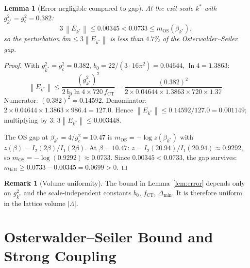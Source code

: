 \documentclass[11pt,a4paper]{amsart}
\newtheorem{lemma}[theorem]{Lemma}
\theoremstyle{definition}
\newtheorem{remark}[theorem]{Remark}
\newcommand{\norm}[1]{\left\|#1\right\|}
\newcommand{\Del}{\Delta_{\min}}
\newcommand{\gB}{g^2_c}
\begin{document}
\begin{lemma}[Error negligible compared to gap]
\label{lem:perturb}
At the exit scale $k^*$ with $g^2_{k^*} = \gB = 0.382$:
\[
  3\,\norm{E_{k^*}} \le 0.00345
  < 0.0733 \le m_{\mathrm{OS}}(\beta_{k^*}),
\]
so the perturbation $\delta m \le 3\norm{E_{k^*}}$ is less than
$4.7\%$ of the Osterwalder--Seiler gap.
\end{lemma}
\begin{proof}
With $g^2_{k^*} = \gB = 0.382$, $b_0 = 22/(3\cdot 16\pi^2) = 0.04644$, $\ln 4 = 1.3863$:
\[
  \norm{E_{k^*}}
  \le \frac{(g^2_{k^*})^2}{2\,b_0\ln 4\times 720\,f_{\mathrm{CT}}}
  = \frac{(0.382)^2}{2\times 0.04644\times 1.3863\times 720\times 1.37}.
\]
Numerator: $(0.382)^2 = 0.14592$.
Denominator: $2\times 0.04644\times 1.3863\times 986.4 = 127.0$.
Hence $\norm{E_{k^*}} \le 0.14592/127.0 = 0.001149$;
multiplying by $3$: $3\norm{E_{k^*}} \le 0.003448$.

The OS gap at $\beta_{k^*} = 4/\gB = 10.47$ is
$m_{\mathrm{OS}} = -\log z(\beta_{k^*})$ with $z(\beta) = I_2(2\beta)/I_1(2\beta)$.
At $\beta = 10.47$: $z = I_2(20.94)/I_1(20.94) \approx 0.9292$,
so $m_{\mathrm{OS}} = -\log(0.9292) \approx 0.0733$.
Since $0.00345 < 0.0733$, the gap survives:
$m_{\mathrm{latt}} \ge 0.0733 - 0.00345 = 0.0699 > 0$.
\end{proof}

\begin{remark}[Volume uniformity]
The bound in Lemma~\ref{lem:error} depends only on $g^2_{k^*}$ and the
scale-independent constants $b_0$, $f_{\mathrm{CT}}$, $\Del$.
It is therefore uniform in the lattice volume $|\Lambda|$.
\end{remark}

\section{Osterwalder--Seiler Bound and Strong Coupling}
\label{sec:OS}
\end{document}
